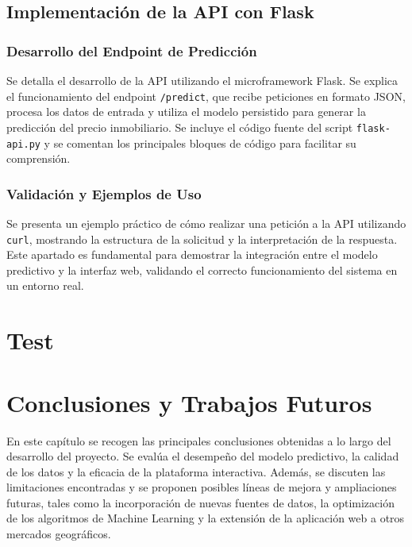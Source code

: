 \documentclass[a4paper,11pt]{book}
\begin{document}
\section{Implementación de la API con Flask}
\subsection{Desarrollo del Endpoint de Predicción}
Se detalla el desarrollo de la API utilizando el microframework Flask. Se explica el funcionamiento del endpoint \texttt{/predict}, que recibe peticiones en formato JSON, procesa los datos de entrada y utiliza el modelo persistido para generar la predicción del precio inmobiliario. Se incluye el código fuente del script \texttt{flask-api.py} y se comentan los principales bloques de código para facilitar su comprensión.

\subsection{Validación y Ejemplos de Uso}
Se presenta un ejemplo práctico de cómo realizar una petición a la API utilizando \texttt{curl}, mostrando la estructura de la solicitud y la interpretación de la respuesta. Este apartado es fundamental para demostrar la integración entre el modelo predictivo y la interfaz web, validando el correcto funcionamiento del sistema en un entorno real.


\chapter{Test}


\chapter{Conclusiones y Trabajos Futuros}
En este capítulo se recogen las principales conclusiones obtenidas a lo largo del desarrollo del proyecto. Se evalúa el desempeño del modelo predictivo, la calidad de los datos y la eficacia de la plataforma interactiva. Además, se discuten las limitaciones encontradas y se proponen posibles líneas de mejora y ampliaciones futuras, tales como la incorporación de nuevas fuentes de datos, la optimización de los algoritmos de Machine Learning y la extensión de la aplicación web a otros mercados geográficos.
\end{document}
